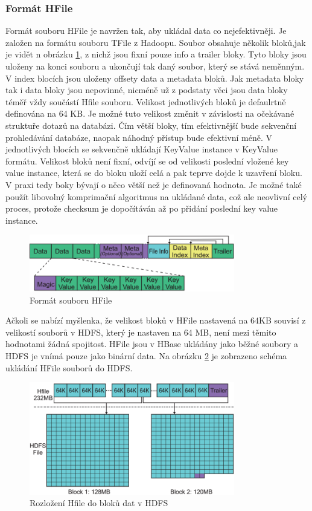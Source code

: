 \documentclass[thesis=M,czech]{FITthesis}[2012/06/26]
\begin{document}
\subsubsection{Formát HFile}
Formát souboru HFile je navržen tak, aby ukládal data co nejefektivněji. Je založen na formátu souboru TFile z Hadoopu. Soubor obsahuje několik bloků,jak je vidět n obrázku \ref{fig:hfile}, z nichž jsou fixní pouze info a trailer bloky. Tyto bloky jsou uloženy na konci souboru a ukončují tak daný soubor, který se stává neměnným. V index blocích jsou uloženy offsety data a metadata bloků. Jak metadata bloky tak i data bloky jsou nepovinné, nicméně už z podstaty věci jsou data bloky téměř vždy součástí Hfile souboru. Velikost jednotlivých bloků je defaulrtně definována na 64 KB. Je možné tuto velikost změnit v závislosti na očekávané struktuře dotazů na databázi. Čím větší bloky, tím efektivnější bude sekvenční prohledávání databáze, naopak náhodný přístup bude efektivní méně. V jednotlivých blocích se sekvenčně ukládají KeyValue instance v KeyValue formátu. Velikost bloků není fixní, odvíjí se od velikosti poslední vložené key value instance, která se do bloku uloží celá a pak teprve dojde k uzavření bloku. V praxi tedy boky bývají o něco větší než je definovaná hodnota. Je možné také použít libovolný komprimační algoritmus na ukládané data, což ale neovlivní celý proces, protože checksum je dopočítáván až po přidání poslední key value instance.
\begin{figure}\centering
	\includegraphics[width=0.8\textwidth, angle=0]{files/HFile}
	\caption[Formát souboru HFile]{Formát souboru HFile}\label{fig:hfile}
\end{figure}


Ačkoli se nabízí myšlenka, že velikost bloků v HFile nastavená na 64KB souvisí z velikostí souborů v HDFS, který je nastaven na 64 MB, není mezi těmito hodnotami žádná spojitost. HFile jsou v HBase ukládány jako běžné soubory a HDFS je vnímá pouze jako binární data. Na obrázku \ref{fig:hfiletohdfs} je zobrazeno schéma ukládání HFile souborů do HDFS.


\begin{figure}\centering
	\includegraphics[width=0.8\textwidth, angle=0]{files/HFileToHDFS}
	\caption[Rozložení Hfile do bloků dat v HDFS]{Rozložení Hfile do bloků dat v HDFS}\label{fig:hfiletohdfs}
\end{figure}
\end{document}
